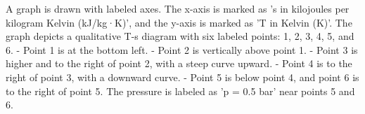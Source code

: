 A graph is drawn with labeled axes. The x-axis is marked as 's in kilojoules per kilogram Kelvin (kJ/kg·K)', and the y-axis is marked as 'T in Kelvin (K)'. The graph depicts a qualitative T-s diagram with six labeled points: 1, 2, 3, 4, 5, and 6.  
- Point 1 is at the bottom left.  
- Point 2 is vertically above point 1.  
- Point 3 is higher and to the right of point 2, with a steep curve upward.  
- Point 4 is to the right of point 3, with a downward curve.  
- Point 5 is below point 4, and point 6 is to the right of point 5.  
The pressure is labeled as 'p = 0.5 bar' near points 5 and 6.